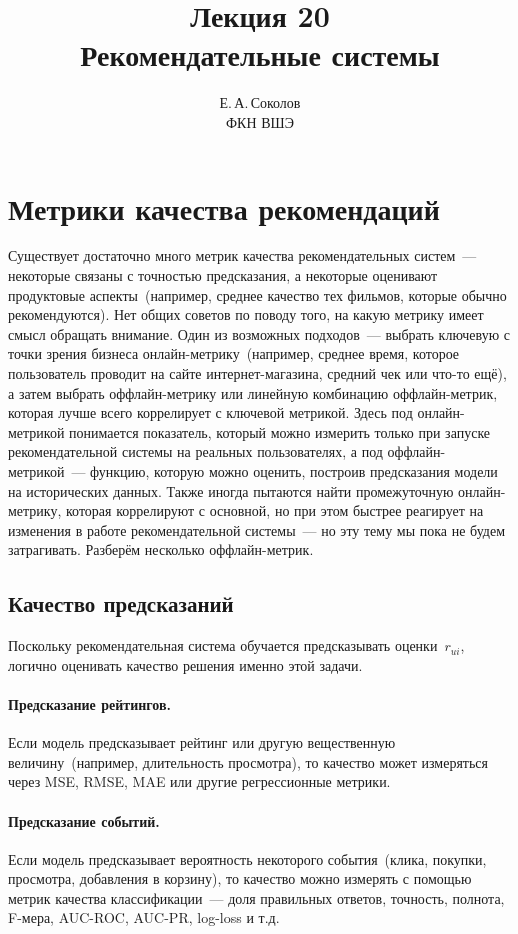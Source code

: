 \documentclass[12pt,fleqn]{article}
\begin{document}
\title{Лекция 20\\Рекомендательные системы}
\author{Е.\,А.\,Соколов\\ФКН ВШЭ}
\maketitle

\section{Метрики качества рекомендаций}

Существует достаточно много метрик качества рекомендательных систем~--- некоторые связаны
с точностью предсказания, а некоторые оценивают продуктовые аспекты~(например, среднее
качество тех фильмов, которые обычно рекомендуются).
Нет общих советов по поводу того, на какую метрику имеет смысл обращать внимание.
Один из возможных подходов~--- выбрать ключевую с точки зрения бизнеса онлайн-метрику~(например,
среднее время, которое пользователь проводит на сайте интернет-магазина, средний чек или что-то ещё),
а затем выбрать оффлайн-метрику или линейную комбинацию оффлайн-метрик, которая лучше
всего коррелирует с ключевой метрикой.
Здесь под онлайн-метрикой понимается показатель, который можно измерить
только при запуске рекомендательной системы на реальных пользователях,
а под оффлайн-метрикой~--- функцию, которую можно оценить, построив
предсказания модели на исторических данных.
Также иногда пытаются найти промежуточную онлайн-метрику, которая коррелируют с основной,
но при этом быстрее реагирует на изменения в работе рекомендательной системы~--- но эту
тему мы пока не будем затрагивать.
Разберём несколько оффлайн-метрик.

\subsection{Качество предсказаний}
Поскольку рекомендательная система обучается предсказывать оценки~$r_{ui}$,
логично оценивать качество решения именно этой задачи.

\paragraph{Предсказание рейтингов.}
Если модель предсказывает рейтинг или другую вещественную величину~(например, длительность просмотра),
то качество может измеряться через MSE, RMSE, MAE или другие регрессионные метрики.

\paragraph{Предсказание событий.}
Если модель предсказывает вероятность некоторого события~(клика, покупки, просмотра, добавления в корзину),
то качество можно измерять с помощью метрик качества классификации~--- доля правильных ответов, точность, полнота, F-мера,
AUC-ROC, AUC-PR, log-loss и т.д.
\end{document}
